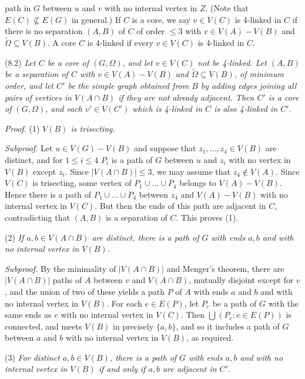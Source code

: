 \noindent path in $G$ between $u$ and $v$ with no internal vertex in $Z$. (Note that $E(C) \not\subseteq E(G)$ in general.) If $C$ is a core, we say $v \in V(C)$ is 4-linked in $C$ if there is no separation $(A, B)$ of $C$ of order $\le 3$ with $v \in V(A) - V(B)$ and $\tilde{\Omega} \subseteq V(B)$. A core $C$ is 4-linked if every $v \in V(C)$ is 4-linked in $C$.

\stmt
(8.2) \textit{Let $C$ be a core of $(G, \Omega)$, and let $v \in V(C)$ not be 4-linked. Let $(A, B)$ be a separation of $C$ with $v \in V(A) - V(B)$ and $\tilde{\Omega} \subseteq V(B)$, of minimum order, and let $C'$ be the simple graph obtained from $B$ by adding edges joining all pairs of vertices in $V(A \cap B)$ if they are not already adjacent. Then $C'$ is a core of $(G, \Omega)$, and each $v' \in V(C')$ which is 4-linked in $C$ is also 4-linked in $C'$.}

\textit{Proof.} (1) \textit{$V(B)$ is trisecting.}

\textit{Subproof.} Let $u \in V(G) - V(B)$ and suppose that $z_1, \dots, z_4 \in V(B)$ are distinct, and for $1 \le i \le 4$ $P_i$ is a path of $G$ between $u$ and $z_i$ with no vertex in $V(B)$ except $z_i$. Since $|V(A \cap B)| \le 3$, we may assume that $z_4 \notin V(A)$. Since $V(C)$ is trisecting, some vertex of $P_1 \cup \dots \cup P_4$ belongs to $V(A) - V(B)$. Hence there is a path of $P_1 \cup \dots \cup P_4$ between $z_4$ and $V(A) - V(B)$ with no internal vertex in $V(C)$. But then the ends of this path are adjacent in $C$, contradicting that $(A, B)$ is a separation of $C$. This proves (1).

\hspace*{12pt}(2) \textit{If $a, b \in V(A \cap B)$ are distinct, there is a path of $G$ with ends $a, b$ and with no internal vertex in $V(B)$.}

\textit{Subproof.} By the minimality of $|V(A \cap B)|$ and Menger's theorem, there are $|V(A \cap B)|$ paths of $A$ between $v$ and $V(A \cap B)$, mutually disjoint except for $v$, and the union of two of these yields a path $P$ of $A$ with ends $a$ and $b$ and with no internal vertex in $V(B)$. For each $e \in E(P)$, let $P_e$ be a path of $G$ with the same ends as $e$ with no internal vertex in $V(C)$. Then $\bigcup (P_e : e \in E(P))$ is connected, and meets $V(B)$ in precisely $\{a, b\}$, and so it includes a path of $G$ between $a$ and $b$ with no internal vertex in $V(B)$, as required.

\hspace*{12pt}(3) \textit{For distinct $a, b \in V(B)$, there is a path of $G$ with ends $a, b$ and with no internal vertex in $V(B)$ if and only if $a, b$ are adjacent in $C'$.}

